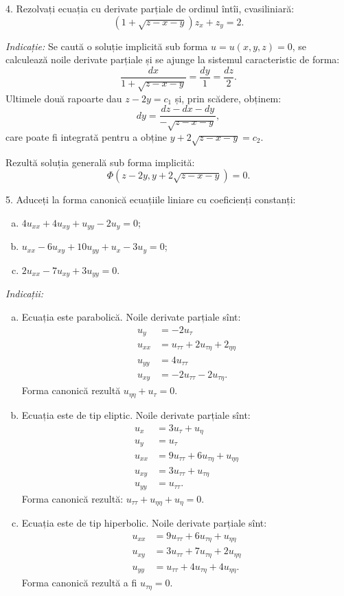 \vspace{1cm}

4. Rezolvați ecuația cu derivate parțiale de ordinul întîi, cvasiliniară:
\[
  (1 + \sqrt{z - x - y})z_x + z_y = 2.
\]

\emph{Indicație:} Se caută o soluție implicită sub forma $ u = u(x, y, z) = 0 $, se calculează
noile derivate parțiale și se ajunge la sistemul caracteristic de forma:
\[
  \dfrac{dx}{1 + \sqrt{z - x - y}} = \dfrac{dy}{1} = \dfrac{dz}{2}.
\]
Ultimele două rapoarte dau $ z - 2y = c_1 $ și, prin scădere, obținem:
\[
  dy = \dfrac{dz - dx - dy}{-\sqrt{z - x - y}},
\]
care poate fi integrată pentru a obține $ y + 2 \sqrt{z - x - y} = c_2 $.

Rezultă soluția generală sub forma implicită:
\[
  \Phi(z - 2y, y + 2 \sqrt{z - x - y}) = 0.
\]

\vspace{1cm}

5. Aduceți la forma canonică ecuațiile liniare cu coeficienți constanți:
\begin{enumerate}[(a)]
\item $ 4u_{xx} + 4u_{xy} + u_{yy} - 2u_y = 0 $;
\item $ u_{xx} - 6u_{xy} + 10u_{yy} + u_x - 3u_y = 0 $;
\item $ 2u_{xx} - 7u_{xy} + 3u_{yy} = 0 $.
\end{enumerate}

\emph{Indicații:}
\begin{enumerate}[(a)]
\item Ecuația este parabolică. Noile derivate parțiale sînt:
  \begin{align*}
    u_y &= -2u_\tau \\
    u_{xx} &= u_{\tau\tau} + 2u_{\tau\eta} + 2_{\eta\eta} \\
    u_{yy} &= 4u_{\tau\tau} \\
    u_{xy} &= -2u_{\tau\tau} - 2u_{\tau\eta}.
  \end{align*}
  Forma canonică rezultă $ u_{\eta\eta} + u_\tau = 0 $.
\item Ecuația este de tip eliptic. Noile derivate parțiale sînt:
  \begin{align*}
    u_x &= 3u_\tau + u_\eta \\
    u_y &= u_\tau \\
    u_{xx} &= 9u_{\tau\tau} + 6u_{\tau\eta} + u_{\eta\eta} \\
    u_{xy} &= 3u_{\tau\tau} + u_{\tau\eta} \\
    u_{yy} &= u_{\tau\tau}.
  \end{align*}
  Forma canonică rezultă: $ u_{\tau\tau} + u_{\eta\eta} + u_\eta = 0 $.
\item Ecuația este de tip hiperbolic. Noile derivate parțiale sînt:
  \begin{align*}
    u_{xx} &= 9u_{\tau\tau} + 6u_{\tau\eta} + u_{\eta\eta} \\
    u_{xy} &= 3u_{\tau\tau} + 7u_{\tau\eta} + 2u_{\eta\eta} \\
    u_{yy} &= u_{\tau\tau} + 4u_{\tau\eta} + 4u_{\eta\eta}.
  \end{align*}
  Forma canonică rezultă a fi $ u_{\tau\eta} = 0 $.
\end{enumerate}

